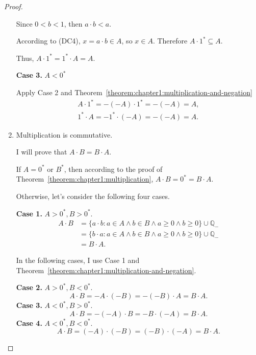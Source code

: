 \begin{proof}
\begin{enumerate}[label={(F\arabic*)}, start=5]
              Since $0 < b < 1$, then $a\cdot b < a$.

              According to (DC4), $x = a\cdot b\in A$, so $x\in A$. Therefore $A\cdot {1}^{*}\subseteq A$.

              \bigskip

              Thus, $A\cdot {1}^{*} = {1}^{*}\cdot A = A$.

              \textbf{Case 3.} $A < 0^{*}$

              Apply Case 2 and Theorem~\ref{theorem:chapter1:multiplication-and-negation}
              \[
                  \begin{split}
                      A\cdot {1}^{*} = -(-A)\cdot {1}^{*} = -(-A) = A, \\
                      {1}^{*}\cdot A = -{1}^{*}\cdot (-A) = -(-A) = A.
                  \end{split}
              \]
        \item Multiplication is commutative.

              I will prove that $A\cdot B = B\cdot A$.

              If $A = {0}^{*}$ or $B^{*}$, then according to the proof of Theorem~\ref{theorem:chapter1:multiplication}, $A\cdot B = {0}^{*} = B\cdot A$.

              Otherwise, let's consider the following four cases.

              \textbf{Case 1.} $A > {0}^{*}, B > {0}^{*}$.
              \begin{align*}
                  A\cdot B & = \{ a\cdot b : a\in A\land b\in B\land a\ge 0\land b\ge 0 \}\cup\mathbb{Q}_{-} \\
                           & = \{ b\cdot a : a\in A\land b\in B\land a\ge 0\land b\ge 0 \}\cup\mathbb{Q}_{-} \\
                           & = B\cdot A.
              \end{align*}

              In the following cases, I use Case 1 and Theorem~\ref{theorem:chapter1:multiplication-and-negation}.

              \textbf{Case 2.} $A > {0}^{*}, B < {0}^{*}$.
              \[
                  A\cdot B = -A\cdot (-B) = -(-B)\cdot A = B\cdot A.
              \]
              \textbf{Case 3.} $A < {0}^{*}, B > {0}^{*}$.
              \[
                  A\cdot B = -(-A)\cdot B = -B\cdot (-A) = B\cdot A.
              \]
              \textbf{Case 4.} $A < {0}^{*}, B < {0}^{*}$.
              \[
                  A\cdot B = (-A)\cdot (-B) = (-B)\cdot (-A) = B\cdot A.
              \]
    \end{enumerate}
\end{proof}

